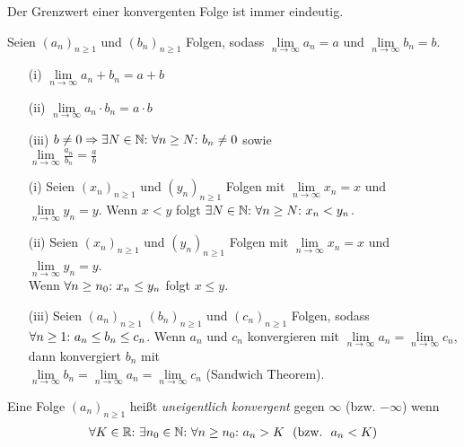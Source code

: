 \begin{framedthm}
	Der Grenzwert einer konvergenten Folge ist immer eindeutig.
\end{framedthm}

\begin{framedthm}
	Seien $(a_n)_{n\geq 1}$ und $(b_n)_{n\geq 1}$ Folgen, sodass $\lim\limits_{n \to \infty} a_n = a$ und $\lim\limits_{n \to \infty} b_n = b$.
	\begin{enumerate}
		\item[(i)]  $\lim\limits_{n \to \infty} a_n + b_n = a + b$
		\item[(ii)]  $\lim\limits_{n \to \infty} a_n \cdot b_n = a \cdot b$
		\item[(iii)] $b \neq 0 \Rightarrow \exists N \in \mathbb{N}{:}\  \forall n \geq N{:}\  b_n \neq 0$ sowie \\
		$\lim\limits_{n \to \infty} \frac{a_n}{b_n} = \frac{a}{b}$ 
	\end{enumerate}
	
\end{framedthm}

\begin{framedthm}
	\begin{enumerate}
		\item[(i)] Seien $(x_n)_{n\geq 1}$ und $(y_n)_{n\geq 1}$ Folgen mit $\lim\limits_{n \to \infty} x_n = x$ und $\lim\limits_{n \to \infty} y_n = y$. Wenn $x < y$ folgt $\exists N \in \mathbb{N}{:}\  \forall n \geq N{:}\  x_n < y_n$.
		\item[(ii)] Seien $(x_n)_{n\geq 1}$ und $(y_n)_{n\geq 1}$ Folgen mit $\lim\limits_{n \to \infty} x_n = x$ und $\lim\limits_{n \to \infty} y_n = y$.\\Wenn $\forall n \geq n_0{:}\  x_n \leq y_n$ folgt $x \leq y$.
		\item[(iii)] Seien $(a_n)_{n\geq 1}$ $(b_n)_{n\geq 1}$ und $(c_n)_{n\geq 1}$ Folgen, sodass $\forall n\geq 1{:}\  a_n \leq b_n \leq c_n$. Wenn $a_n$ und $c_n$ konvergieren mit $\lim\limits_{n \to \infty} a_n = \lim\limits_{n \to \infty} c_n$, dann konvergiert $b_n$ mit\\$\lim\limits_{n \to \infty} b_n = \lim\limits_{n \to \infty} a_n = \lim\limits_{n \to \infty} c_n$ (Sandwich Theorem).
	\end{enumerate}
\end{framedthm}

\begin{frameddefn}
	Eine Folge $(a_n)_{n\geq 1}$ heißt \textit{uneigentlich konvergent} gegen $\infty$ (bzw. $-\infty$) wenn 
	\begin{align*}
		\forall K \in \mathbb{R}{:}\  \exists n_0 \in \mathbb{N}{:}\  \forall n \geq n_0{:}\  a_n > K\ \ \textrm{(bzw.}\ \  a_n < K\textrm{)}
	\end{align*}
	
\end{frameddefn}



